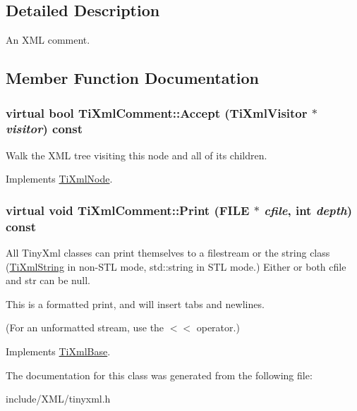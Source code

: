 \subsection{Detailed Description}
An XML comment. 

\subsection{Member Function Documentation}
\hypertarget{class_ti_xml_comment_af3ac1b99fbbe9ea4fb6e14146156e43e}{
\subsubsection[{Accept}]{\setlength{\rightskip}{0pt plus 5cm}virtual bool TiXmlComment::Accept ({\bf TiXmlVisitor} $\ast$ {\em visitor}) const}}
\label{class_ti_xml_comment_af3ac1b99fbbe9ea4fb6e14146156e43e}
Walk the XML tree visiting this node and all of its children. 

Implements \hyperlink{class_ti_xml_node_acc0f88b7462c6cb73809d410a4f5bb86}{TiXmlNode}.\hypertarget{class_ti_xml_comment_a6b316527aaa8da0370cd68c22a5a0f5f}{
\subsubsection[{Print}]{\setlength{\rightskip}{0pt plus 5cm}virtual void TiXmlComment::Print (FILE $\ast$ {\em cfile}, \/  int {\em depth}) const}}
\label{class_ti_xml_comment_a6b316527aaa8da0370cd68c22a5a0f5f}
All TinyXml classes can print themselves to a filestream or the string class (\hyperlink{class_ti_xml_string}{TiXmlString} in non-\/STL mode, std::string in STL mode.) Either or both cfile and str can be null.

This is a formatted print, and will insert tabs and newlines.

(For an unformatted stream, use the $<$$<$ operator.) 

Implements \hyperlink{class_ti_xml_base_a0de56b3f2ef14c65091a3b916437b512}{TiXmlBase}.

The documentation for this class was generated from the following file:\begin{DoxyCompactItemize}
\item 
include/XML/tinyxml.h\end{DoxyCompactItemize}
